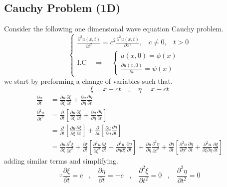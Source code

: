 \documentclass[]{article}
\begin{document}
\subsection{Cauchy Problem (1D)}
Consider the following one dimensional wave equation Cauchy problem.
\begin{equation}
    \begin{cases}
        \displaystyle \frac{\partial^2 u\left(x,t \right)}{\partial t^2} = c^2\frac{\partial^2 u\left(x,t \right)}{\partial x^2},\;\;\; c\neq 0,\;\;\; t>0
        \\
        \text{I.C} \quad \Longrightarrow \quad 
        \begin{cases}
            u\left(x,0 \right) = \phi\left(x\right)
            \\
            \frac{\partial u\left(x,0 \right)}{\partial t} = \psi\left(x\right)
        \end{cases}
    \end{cases}
\end{equation}
we start by preforming a change of variables such that.
\[
    \xi = x+ct \quad , \quad \eta = x-ct    
\]
\begin{align*}
\frac{\partial u}{\partial t} &= \frac{\partial u}{\partial \xi}\frac{\partial \xi}{\partial t} + \frac{\partial u}{\partial \eta} \frac{\partial \eta}{\partial t}
\\
\frac{\partial^2 u}{\partial t^2} &= \frac{\partial}{\partial t}\left[ \frac{\partial u}{\partial \xi}\frac{\partial \xi}{\partial t} + \frac{\partial u}{\partial \eta} \frac{\partial \eta}{\partial t}\right]
\\
&= \frac{\partial}{\partial t}\left[ \frac{\partial u}{\partial \xi}\frac{\partial \xi}{\partial t}\right] + \frac{\partial}{\partial t}\left[\frac{\partial u}{\partial \eta} \frac{\partial \eta}{\partial t}\right]
\\
&= \frac{\partial u}{\partial \xi}\frac{\partial^2 \xi}{\partial t^2} + \frac{\partial \xi}{\partial t}\left[\frac{\partial^2 u}{\partial \xi^2}\frac{\partial \xi}{\partial t} + \frac{\partial^2 u}{\partial\eta \partial\xi}\frac{\partial \eta}{\partial t} \right]+\frac{\partial u}{\partial \eta}\frac{\partial^2 \eta}{\partial t^2}+\frac{\partial \eta}{\partial t}\left[\frac{\partial^2 u}{\partial \eta^2}\frac{\partial \eta}{\partial t}+\frac{\partial^2 u}{\partial\xi\partial\eta}\frac{\partial\xi}{\partial t}\right]
\end{align*}
adding similar terms and simplifying.
\[
\because \frac{\partial\xi}{\partial t}=c\;\;\;,\;\;\;\frac{\partial\eta}{\partial t}=-c\;\;\;,\;\;\;\frac{\partial^2\xi}{\partial t^2}=0\;\;\;,\;\;\;\frac{\partial^2\eta}{\partial t^2}=0    
\]
\end{document}
